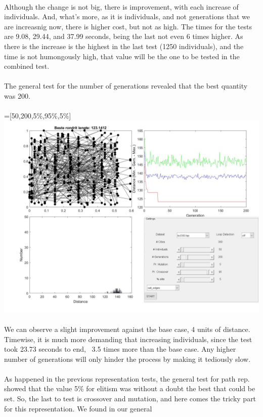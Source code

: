 \\
Although the change is not big, there is improvement, with each increase
of individuals. And, what's more, as it is individuals, and not
generations that we are increasnig now, there is higher cost, but not as high.
The times for the tests are 9.08, 29.44, and 37.99 seconds, being the last not
even 6 times higher. As there is the increase is the highest in the last
test (1250 individuals), and the time is not humongously high, that value
will be the one to be tested in the combined test.\\ 
\\
The general test for the number of generations revealed that the best quantity
was 200.\\
\\
 =[50,200,5\%,95\%,5\%]\\
\includegraphics[width=\textwidth]{img/specific/order_crossover/general_5.jpg}\\
\\
We can observe a slight improvement against the base case, 4 units of
distance. Timewise, it is much more demanding that increasing
individuals, since the test took 23.73 seconds to end, ~3.5 times more than the
base case. Any higher number of generations will only hinder the process
by making it tediously slow.\\
\\
As happened in the previous representation tests, the general test for path
rep. showed that the value 5\% for elitism was without a doubt the best that
could be set. So, the last to test is crossover and mutation, and here comes the tricky part for this representation. We found in our general
